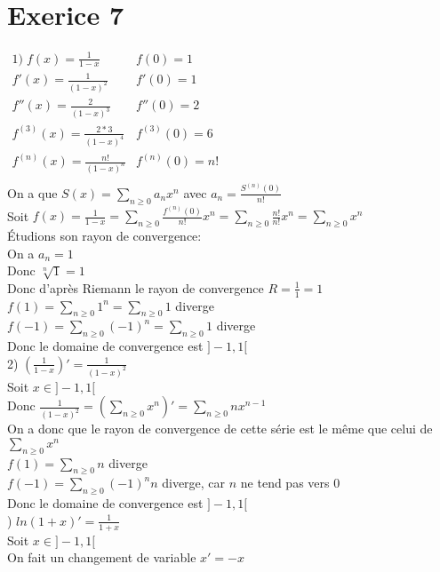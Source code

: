 \documentclass{article}
\author{Frederic Becerril}
\begin{document}
\part*{Exerice 7}

$\begin{matrix}
    1) \;f(x) = \frac{1}{1 - x} & f(0) = 1\\
    f'(x) = \frac{1}{(1 - x)^2} & f'(0) = 1\\
    f''(x) = \frac{2}{(1 - x)^3} & f''(0) = 2\\
    f^{(3)}(x) = \frac{2 * 3}{(1 - x)^4} & f^{(3)}(0) = 6\\
    f^{(n)}(x) = \frac{n!}{(1 - x)^n} & f^{(n)}(0) = n!\\
\end{matrix}$\\
On a que $S(x) = \sum_{n \geq 0} a_n x^n$ avec $a_n = \frac{S^{(n)}(0)}{n!}$\\
Soit $f(x) = \frac{1}{1 -x} = \sum_{n \geq 0} \frac{f^{(n)}(0)}{n!} x^n = \sum_{n \geq 0} \frac{n!}{n!}x^n = \sum_{n \geq 0} x^n$\\
Étudions son rayon de convergence:\\
On a $a_n = 1$\\
Donc $\sqrt[n]{1} = 1$\\
Donc d'après Riemann le rayon de convergence $R = \frac{1}{1} = 1$\\
$f(1) = \sum_{n \geq 0} 1^n = \sum_{n \geq 0} 1$ diverge\\
$f(-1) = \sum_{n \geq 0} (-1)^n = \sum_{n \geq 0} 1$ diverge\\
Donc le domaine de convergence est $]-1, 1[$\\
2) $(\frac{1}{1 - x})' = \frac{1}{(1 - x)^2}$\\
Soit $x \in ]-1, 1[$\\
Donc $\frac{1}{(1 - x)^2} = \left(\sum_{n \geq 0} x^n\right)' = \sum_{n \geq 0} n x^{n - 1}$\\
On a donc que le rayon de convergence de cette série est le même que celui de $\sum_{n \geq 0} x^n$\\
$f(1) = \sum_{n \geq 0} n$ diverge\\
$f(-1) = \sum_{n \geq 0} (-1)^n n$ diverge, car $n$ ne tend pas vers 0\\
Donc le domaine de convergence est $]-1, 1[$\\
\newpage
{}) $ln(1+x)' = \frac{1}{1+x}$\\
Soit $x \in ]-1, 1[$\\
On fait un changement de variable $x' = -x$\\
\end{document}
